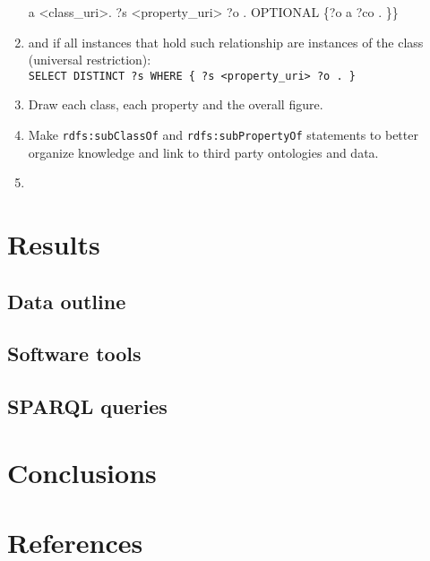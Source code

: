 \documentclass[review]{elsarticle}
\begin{document}
\begin{enumerate}[leftmargin=0cm]
{                a <class\_uri>. ?s <property\_uri> ?o . OPTIONAL \{?o a ?co . \}\}}
    \item and if all instances that hold such relationship are instances of the class
        (universal restriction):\\
        \texttt{SELECT DISTINCT ?s WHERE \{ ?s <property\_uri> ?o . \}}
    \item Draw each class, each property and the overall figure.
    \item Make \texttt{rdfs:subClassOf} and \texttt{rdfs:subPropertyOf}
        statements to better organize knowledge and link to third party
        ontologies and data.
    \item
\end{enumerate}
 

\section{Results}
\label{outline}
\subsection{Data outline}
\subsection{Software tools}
\subsection{SPARQL queries}

\section{Conclusions}
\label{conclusions}

\section*{References}
%

%
%
\end{document}
